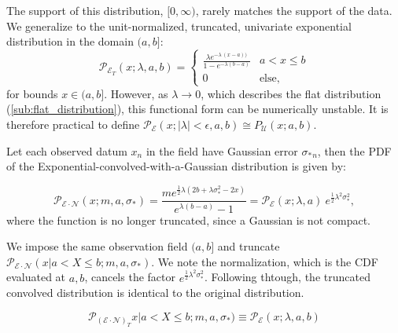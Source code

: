 \documentclass[twocolumn]{aastex631}
\newcommand{\mcal}[1]{\mathcal{#1}}
\newcommand{\Exp}[1]{e^{#1}}
\newcommand{\pdf}{\mcal{P}}
\newcommand{\sigobs}{{\sigma_*}}
\begin{document}
{        The support of this distribution, $[0, \infty)$, rarely matches the
        support of the data. We generalize to the unit-normalized, truncated,
        univariate exponential distribution in the domain $(a, b]$:
        \begin{equation} \label{eq:pdf_truncexp_univariate}
            \pdf_{\mcal{E}_T}(x; \lambda, a, b) = \begin{cases}
                \frac{\lambda \Exp{-\lambda \, (x - a))}}{1 - \Exp{-\lambda(b - a)}} & a < x \leq b \\
                0 & \text{else},
            \end{cases}
        \end{equation}
        for bounds $x \in (a,b]$. However, as $\lambda \rightarrow 0$, which
        describes the flat distribution (\autoref{sub:flat_distribution}), this
        functional form can be numerically unstable. It is therefore practical
        to define $\pdf_{\mcal{E}}(x; |\lambda| < \epsilon, a, b) \cong
        P_{\mcal{U}}(x; a,b)$.

        Let each observed datum $x_n$ in the field have Gaussian error
        $\sigobs_n$, then the PDF of the Exponential-convolved-with-a-Gaussian
        distribution is given by:

        \begin{equation}
            \pdf_{\mcal{E}\cdot\mcal{N}}(x;m,a,\sigma_*) = \frac{m  e^{\frac{1}{2} \lambda  \left(2 b+\lambda  \sigma _*^2-2 x\right)}}{e^{\lambda  (b-a)}-1} = \pdf_{\mcal{E}}(x;\lambda,a) \ \Exp{\frac{1}{2}\lambda^2 \sigma_*^2},
        \end{equation}
        where the function is no longer truncated, since a Gaussian is not
        compact.

        We impose the same observation field $(a, b]$ and truncate
        $\pdf_{\mcal{E}\cdot\mcal{N}}(x | a < X \leq b;m,a,\sigma_*)$.  We note
        the normalization, which is the CDF evaluated at $a, b$, cancels the
        factor $\Exp{\frac{1}{2}\lambda^2 \sigma_*^2}$. Following thtough, the
        truncated convolved distribution is identical to the original
        distribution.

        \begin{equation}
            \pdf_{(\mcal{E}\cdot\mcal{N})_T}x | a < X \leq b;m,a,\sigma_*) \equiv \pdf_{\mcal{E}}(x; \lambda, a, b)
        \end{equation}

    \vspace{10pt}
}
\end{document}
